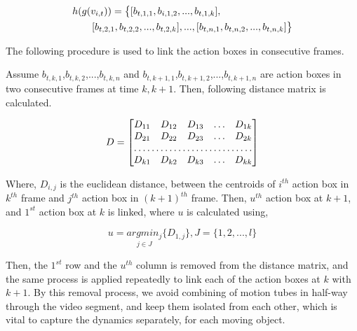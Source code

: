\begin{equation}
\label{eqn:action box transformed}
\begin{split}
\MoveEqLeft
 h(g(v_{i,t})) = \big\{[b_{t,1,1},b_{i,1,2},...,b_{t,1,k}],\\
 & [b_{t,2,1},b_{t,2,2},...,b_{t,2,k}],...,[b_{t,n,1},b_{t,n,2},...,b_{t,n,k}]\big\}
\end{split}
\end{equation}


The following procedure
is used to link the action boxes in consecutive frames.

Assume $b_{t,k,1}$,$b_{t,k,2}$,...,$b_{t,k,n}$ and $b_{t,k+1,1}$,$b_{t,k+1,2}$,...,$b_{t,k+1,n}$  are action boxes in two 
consecutive frames at time $k,k+1$. Then, following distance matrix is calculated.


 
\begin{equation}
D=\begin{bmatrix}
    D_{11}       & D_{12} & D_{13} & \dots & D_{1k} \\
    D_{21}       & D_{22} & D_{23} & \dots & D_{2k} \\
    \hdotsfor{5} \\
    D_{k1}       & D_{k2} & D_{k3} & \dots & D_{kk}
\end{bmatrix}
\end{equation}


Where, $D_{i,j}$ is the euclidean distance, between the centroids of $i^{th}$ action box in $k^{th}$ frame and $j^{th}$ action box in $(k+1)^{th}$ frame. 
Then, $u^{th}$ action box at $k+1$, and $1^{st}$ action box at $k$ is linked, where $u$ is calculated using,


\begin{equation}
u=\underset{j\in J}{argmin_j}\{D_{1,j}\}, J=\{1,2,...,l\}
\end{equation}

Then, the $1^{st}$ row and the $u^{th}$ column is removed from the distance matrix, and the same process is applied repeatedly
to link each of the action boxes at $k$ with $k+1$. By this removal process, we avoid combining of motion tubes in half-way through 
the video segment, and keep them isolated from each other, which is vital to capture the dynamics separately, for each moving object.




